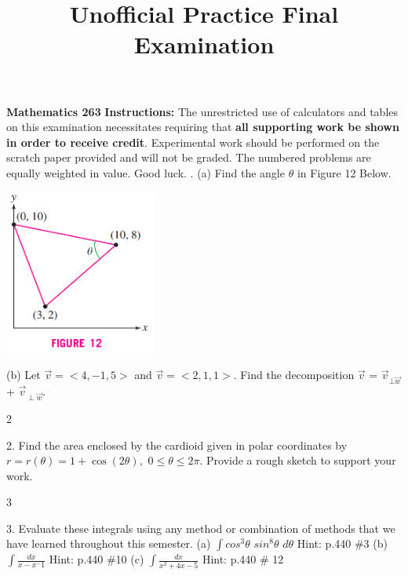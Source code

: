 \documentclass{article}
\begin{document}
\title{Unofficial Practice Final Examination}
\makeatletter
\begin{flushright}
\end{flushright}
\textbf{Mathematics 263
\newline
\@title}
\newline\newline
\textbf{Instructions:} The unrestricted use of calculators and tables on this examination necessitates requiring that \textbf{all supporting work be shown in order to receive credit}. Experimental work should be performed on the scratch paper provided and will not be graded. The numbered problems are equally weighted in value. Good luck.
\newline{}. (a) Find the angle $\theta$ in Figure 12 Below.
\begin{flushright}
\includegraphics[width=5cm,right]{images/CalcTestPicture3.png}
\end{flushright}
\vfill
(b) Let $\vec{v}= < 4,-1,5>$ and $\vec{v}=< 2,1,1 >$. Find the decomposition $\vec{v}$ = $\vec{v}_{\bot \vec{w}}$ + $\vec{v}_{\perp \vec{w}}$.
\vfill
\vfill

\newpage

\begin{flushleft}
2
\end{flushleft}
2. Find the area enclosed by the cardioid given in polar coordinates by $r = r(\theta) = 1 + \cos (2\theta),$ $0 \leq \theta \leq 2\pi$. Provide a rough sketch to support your work.

\newpage
\begin{flushright}
3
\end{flushright}
3. Evaluate these integrals using any method or combination of methods that we have learned throughout this semester.
\newline \newline
(a) $\displaystyle \int cos^3 \theta $ $ sin^8 \theta $ $d\theta$ Hint: p.440 \#3
\vfill
(b) $\displaystyle \int \frac{dx}{x-x^-1}$ Hint: p.440 \#10
\vfill
(c) $\displaystyle \int \frac{dx}{x^2+4x-5}$  Hint: p.440 \# 12
\vfill
\end{document}
